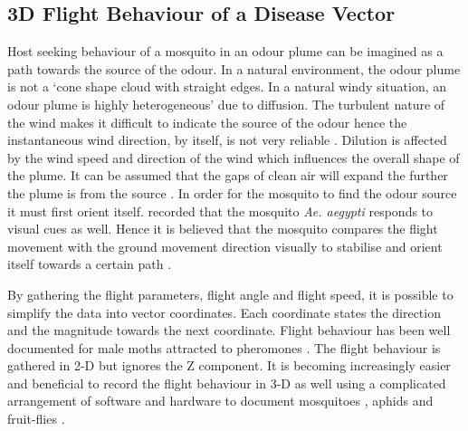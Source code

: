 \subsection{3D Flight Behaviour of a Disease Vector}

Host seeking behaviour of a mosquito in an odour plume can be imagined as a path towards the source of the odour. In a natural environment, the odour plume is not a `cone shape cloud with straight edges. In a natural windy situation, an odour plume is highly heterogeneous'\cite{beeuwkes20083} due to diffusion. The turbulent nature of the wind makes it difficult to indicate the source of the odour hence the instantaneous wind direction, by itself, is not very reliable \cite{brady1989odour}.  Dilution is affected by the wind speed and direction of the wind which influences the overall shape of the plume. It can be assumed that the gaps of clean air will expand the further the plume is from the source \cite{murlis1992odor}. In order for the mosquito to find the odour source it must first orient itself. \cite{kennedy1939behaviour} recorded that the mosquito \textit{Ae. aegypti} responds to visual cues as well. Hence it is believed that the mosquito compares the flight movement with the ground movement direction visually to stabilise and orient itself towards a certain path \cite{carde1984chemo}. 

By gathering the flight parameters, flight angle and flight speed, it is possible to simplify the data into vector coordinates. Each coordinate states the direction and the magnitude towards the next coordinate. Flight behaviour has been well documented for male moths attracted to pheromones \cite{bau2002antennal, marsh1978analysis, schofield2003flight}. The flight behaviour is gathered in 2-D but ignores the Z component. It is becoming increasingly easier and beneficial to record the flight behaviour in 3-D as well using a complicated arrangement of software and hardware to document mosquitoes \cite{Dekker2963, cooperband2006orientation}, aphids \cite{el2000computer} and fruit-flies \cite{budick2006free}.

